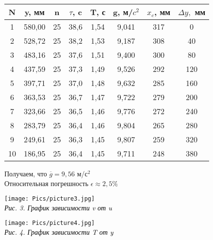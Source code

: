 \documentclass[12pt, a4paper]{article}
\begin{document}
        \begin{center}
            \begin{tabular}{ | c | c | c | c | c | c | c | c | }
                \hline
                N & y, мм & n & $\tau$, c & T, с & g, м/$c^2$ & $x_c$, мм & $\Delta y,$ мм \\ \hline
                1 & 580,00 & 25 & 38,6	& 1,54 & 9,041 & 317 & 0 \\ \hline
                2 & 528,72 & 25 & 38,2	& 1,53	& 9,187 & 308	& 40 \\ \hline
                3 & 483,16 & 25 & 37,6	& 1,51 	& 9,400 & 300	& 80 \\ \hline
                4 & 437,59 & 25 & 37,3  & 1,49	& 9,526 & 292	& 120 \\ \hline
                5 & 397,71 & 25 & 37,0  & 1,48	& 9,632 & 285	& 160 \\ \hline
                6 & 363,53 & 25 & 36,7	& 1,47  & 9,722 & 279 	& 200 \\ \hline
                7 & 323,66 & 25 & 36,5	& 1,46	& 9,776 & 272	& 240 \\ \hline
                8 & 283,79 & 25 & 36,4	& 1,46	& 9,804 & 265	& 280 \\ \hline
                9 & 249,61 & 25 & 36,3	& 1,45	& 9,807 & 259	& 320 \\ \hline
                10 & 186,95 & 25 & 36,4	& 1,45	& 9,711  & 248	& 380 \\ \hline
            \end{tabular}
            \end{center} 
    
            Получаем, что $\overline{g} = 9,56$ м/$с^2$ \\
            Относительная погрешность $\epsilon \approx 2,5\%$ 
            
            \begin{minipage}[c]{\textwidth}
                \begin{center}
                    \texttt{[image: Pics/picture3.jpg]} \\
                    \textit{\textcolor[HTML]{000000}{Рис. 3. График зависимости v от u}}
                \end{center}
            \end{minipage}

            \begin{minipage}[c]{\textwidth}
                \begin{center}
                    \texttt{[image: Pics/picture4.jpg]} \\
                    \textit{\textcolor[HTML]{000000}{Рис. 4. График зависимости T от y}}
                \end{center}
            \end{minipage}
\end{document}

